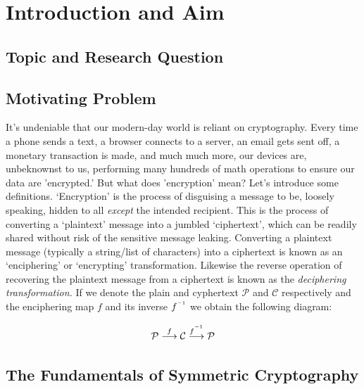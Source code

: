 \documentclass[11pt, a4paper]{report}
\newcommand{\inv}{^{\raisebox{.2em}{$\scriptscriptstyle-1$}}}
\begin{document}
\section{Introduction and Aim}
\subsection{Topic and Research Question}

\subsection{Motivating Problem}
It's undeniable that our modern-day world is reliant on cryptography. Every time a phone sends a text, a browser connects to a server, an email gets sent off, a monetary transaction is made, and much much more, our devices are, unbeknownst to us, performing many hundreds of math operations to ensure our data are 'encrypted.' But what does 'encryption' mean? Let's introduce some definitions. ‘Encryption’ is the process of disguising a message to be, loosely speaking, hidden to all \textit{except} the intended recipient. This is the process of converting a ‘plaintext’ message into a jumbled ‘ciphertext’, which can be readily shared without risk of the sensitive message leaking. Converting a plaintext message (typically a string/list of characters) into a ciphertext is known as an ‘enciphering’ or ‘encrypting’ transformation. Likewise the reverse operation of recovering the plaintext message from a ciphertext is known as the \textit{deciphering transformation.}\autocite[54]{koblitz} If we denote the plain and cyphertext $\mathcal{P}$ and $\mathcal{C}$ respectively and the enciphering map $f$ and its inverse $f\inv$ we obtain the following diagram:

$$ \mathcal{P} \overset{f}\longrightarrow \mathcal{C} \overset{f\inv}\longrightarrow \mathcal{P} $$

\subsection{The Fundamentals of Symmetric Cryptography}
\end{document}
